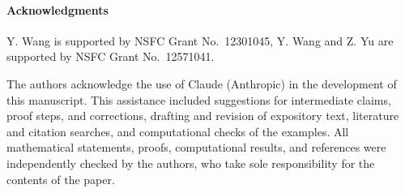 \documentclass[10pt]{article}
\theoremstyle{plain}
\theoremstyle{definition}
\theoremstyle{plain}
\begin{document}
\paragraph*{Acknowledgments}
Y. Wang  is supported by NSFC Grant No.\ 12301045, Y. Wang and Z. Yu are supported by NSFC Grant  No.\ 12571041.

The authors acknowledge the use of Claude (Anthropic) in the development of this manuscript. This assistance included suggestions for intermediate claims, proof steps, and corrections, drafting and revision of expository text, literature and citation searches, and computational checks of the examples. All mathematical statements, proofs, computational results, and references were independently checked by the authors, who take sole responsibility for the contents of the paper.
\end{document}
